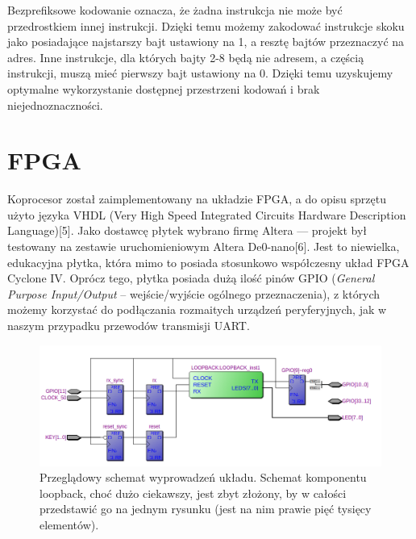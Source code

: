 Bezprefiksowe kodowanie oznacza, że żadna instrukcja nie może być przedrostkiem innej instrukcji. Dzięki temu możemy zakodować instrukcje skoku jako posiadające najstarszy bajt ustawiony na 1, a resztę bajtów przeznaczyć na adres. Inne instrukcje, dla których bajty 2-8 będą nie adresem, a częścią instrukcji, muszą mieć pierwszy bajt ustawiony na 0. Dzięki temu uzyskujemy optymalne wykorzystanie dostępnej przestrzeni kodowań i brak niejednoznaczności.

\section{FPGA}

Koprocesor został zaimplementowany na układzie FPGA, a do opisu sprzętu użyto języka VHDL (Very High Speed Integrated Circuits Hardware Description Language)[5]. Jako dostawcę płytek wybrano firmę Altera --- projekt był testowany na zestawie uruchomieniowym Altera De0-nano[6]. Jest to niewielka, edukacyjna płytka, która mimo to posiada stosunkowo współczesny układ FPGA Cyclone IV. Oprócz tego, płytka posiada dużą ilość pinów GPIO (\textit{General Purpose Input/Output} -- wejście/wyjście ogólnego przeznaczenia), z których możemy korzystać do podłączania rozmaitych urządzeń peryferyjnych, jak w naszym przypadku przewodów transmisji UART.

\begin{figure}
  \begin{center}
    \includegraphics[scale=0.5]{images/schemat.png}
    \caption{Przeglądowy schemat wyprowadzeń układu. Schemat komponentu loopback, choć dużo ciekawszy, jest zbyt złożony, by w całości przedstawić go na jednym rysunku (jest na nim prawie pięć tysięcy elementów).}
    \label{fig:schemat}
  \end{center}
\end{figure}


